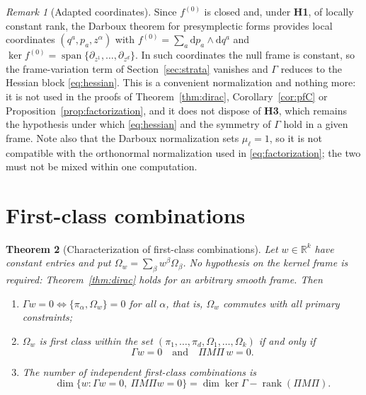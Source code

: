 \documentclass[12pt]{article}
\theoremstyle{plain}
\newtheorem{theorem}{Theorem}[section]
\theoremstyle{definition}
\theoremstyle{remark}
\newtheorem{remark}[theorem]{Remark}
\newcommand{\R}{\mathbb{R}}
\DeclareMathOperator{\rank}{rank}
\DeclareMathOperator{\spn}{span}
\newcommand{\dd}{\mathrm{d}}
\newcommand{\Om}{\Omega}
\begin{document}
	\begin{remark}[Adapted coordinates]
		\label{rem:darboux}
		Since $f^{(0)}$ is closed and, under \textbf{H1}, of locally constant rank, the
		Darboux theorem for presymplectic forms provides local coordinates
		$(q^{a},p_{a},z^{\alpha})$ with $f^{(0)}=\sum_{a}\dd p_{a}\wedge\dd q^{a}$ and
		$\ker f^{(0)}=\spn\{\partial_{z^{1}},\dots,\partial_{z^{d}}\}$. In such
		coordinates the null frame is constant, so the frame-variation term of
		Section~\ref{sec:strata} vanishes and $\Gamma$ reduces to the Hessian block
		\eqref{eq:hessian}. This is a convenient normalization and nothing more: it is
		not used in the proofs of Theorem~\ref{thm:dirac},
		Corollary~\ref{cor:pfC} or Proposition~\ref{prop:factorization}, and it does not
		dispose of \textbf{H3}, which remains the hypothesis under which
		\eqref{eq:hessian} and the symmetry of $\Gamma$ hold in a given frame. Note also
		that the Darboux normalization sets $\mu_{\ell}=1$, so it is not compatible with
		the orthonormal normalization used in \eqref{eq:factorization}; the two must not
		be mixed within one computation.
	\end{remark}
	
	\section{First-class combinations}
	\label{sec:firstclass}
	
	\begin{theorem}[Characterization of first-class combinations]
		\label{thm:firstclass}
		Let $w\in\R^{k}$ have constant entries and put
		$\Om_{w}=\sum_{\beta}w^{\beta}\Om_{\beta}$. No hypothesis on the kernel frame is
		required: Theorem~\ref{thm:dirac} holds for an arbitrary smooth frame. Then
		\begin{enumerate}[label=(\alph*),leftmargin=2.2em,itemsep=0.25em]
			\item $\Gamma w=0\iff\{\pi_{\alpha},\Om_{w}\}=0$ for all $\alpha$, that is,
			$\Om_{w}$ commutes with all primary constraints;
			\item $\Om_{w}$ is first class within the set
			$(\pi_{1},\dots,\pi_{d},\Om_{1},\dots,\Om_{k})$ if and only if
			\begin{equation}
				\Gamma w=0
				\quad\text{and}\quad
				\Pi M\Pi\,w=0 .
				\label{eq:firstclass}
			\end{equation}
			\item The number of independent first-class combinations is
			\begin{equation}
				\dim\{w:\Gamma w=0,\ \Pi M\Pi w=0\}
				=\dim\ker\Gamma-\rank(\Pi M\Pi).
				\label{eq:fccount}
			\end{equation}
		\end{enumerate}
	\end{theorem}
	
\end{document}
